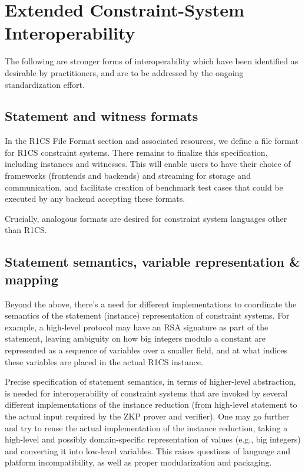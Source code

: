 \section{Extended Constraint-System Interoperability}
\label{implem:interoperability}

The following are stronger forms of interoperability which have been identified as desirable by practitioners, and are to be addressed by the ongoing standardization effort.


\subsection{Statement and witness formats}
In the R1CS File Format section and associated resources, we define a file format for R1CS constraint systems. There remains to finalize this specification, including instances and witnesses. This will enable users to have their choice of frameworks (frontends and backends) and streaming for storage and communication, and facilitate creation of benchmark test cases that could be executed by any backend accepting these formats.
 
Crucially, analogous formats are desired for constraint system languages other than R1CS.


\subsection{Statement semantics, variable representation \& mapping}

Beyond the above, there’s a need for different implementations to coordinate the semantics of the statement (instance) representation of constraint systems. For example, a high-level protocol may have an RSA signature as part of the statement, leaving ambiguity on how big integers modulo a constant are represented as a sequence of variables over a smaller field, and at what indices these variables are placed in the actual R1CS instance.

Precise specification of statement semantics, in terms of higher-level abstraction, is needed for interoperability of constraint systems that are invoked by several different implementations of the instance reduction (from high-level statement to the actual input required by the ZKP prover and verifier). One may go further and try to reuse the actual implementation of the instance reduction, taking a high-level and possibly domain-specific representation of values (e.g., big  integers) and converting it into low-level variables. This raises questions of language and platform incompatibility, as well as proper modularization and packaging.

